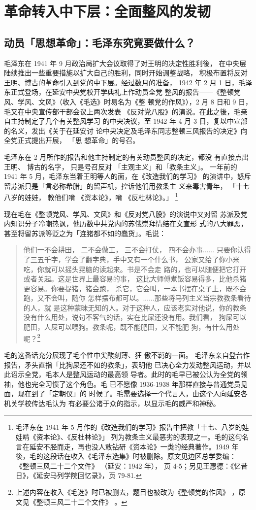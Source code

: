 \chapter{革命转入中下层：全面整风的发韧}
\section{动员「思想革命」：毛泽东究竟要做什么？}
毛泽东在 1941 年 9 月政治局扩大会议取得了对王明的决定性胜利後，
在中央层陆续推出一些重要措施以扩大自己的胜利，同时开始调整战略，
积极布置将反对王明、博古的革命引入到党的中下层。经过数月的准备，
1942 年 2 月 1 日，毛泽东正式登场，在延安中央党校开学典礼上作动员全党
整风的报告——《整顿党风、学风、文风》（收入《毛选》时易名为《整
顿党的作风》），2 月 8 日和 9 日，毛又在中央宣传部干部会议上两次发表
《反对党八股》的演说。在此之後，毛亲自主持制定了几个有关整风学习
的中央决议，至 1942 年 4 月 3 日，复以中宣部的名义，发出《关于在延安讨
论中央决定及毛泽东同志整顿三风报告的决定》向全党正式提出开展，
「思
想革命」的号召。

毛泽东在 2 月所作的报告和他主持制定的有关动员整风的决定，都没
有直接点出王明、
博古的名字，
只是号召反对
「主观主义」和「教条主义」。
一年前的 1941 年 5 月，毛泽东当着王明等人的面，在《改造我们的学习》
的演讲中，怒斥留苏派只是「言必称希腊」的留声机，控诉他们用教条主
义来毒害青年，
「十七八岁的娃娃，
教他们啃
《资本论》，啃
 《反杜林论》。」
\footnote{毛泽东在 1941 年 5 月作的《改造我们的学习》报告中把教「十七、八岁的娃娃啃《资本论》、《反杜林论》」
列为教条主义最恶劣的表现之一。毛的这句名言在延安不胫而走，再也没人敢钻研《资本论》一类的经典著作。1949 年
後，毛的这段话在收入《毛泽东选集》时被删除。原文见边区总学委编：
《整顿三风二十二个文件》
（延安：1942 年），
页 4-5；另见王惠德：《忆昔日》，《延安马列学院回忆录》，页 79-81.}

现在毛在《整顿党风、学风、文风》和《反对党八股》的演说中又对留
苏派及党内知识分子冷嘲热讽，他历数中共党内的苏俄崇拜情结在文宣形
式的八大罪恶，甚至将留苏派等贬之为「连猪都不如的蠢货」。毛说：
\begin{quote}
{\fzwkai 他们一不会耕田，
二不会做工，
三不会打仗，
四不会办事......
只要你认得了三五千字，学会了翻字典，手中又有一个什么书，
公家又给了你小米吃，你就可以摇头晃脑的读起来。书是不会走
路的，也可以随便把它打开或者关起。这是世界上最容易的事，
这比大师傅煮饭容易得多，比他杀猪更容易。你要捉猪，猪会跑，
杀它，它会叫，一本书摆在桌子上，既不会跑，又不会叫，随你
怎样摆布都可以。......那些将马列主义当宗教教条看待的人，就
是这种蒙昧无知的人。对于这种人，应该老实对他说，你的教条
没有什么用处，说句不客气的话，实在比屎还没有用。我们看，
狗屎可以肥田，人屎可以喂狗。教条呢，既不能肥田，又不能肥
狗，有什么用处呢？\footnote{上述内容在收入《毛选》时已被删去，题目也被改为《整顿党的作风》
，原文见《整顿三风二十二个文件》
。}}
\end{quote}
毛的这番话充分展现了毛个性中尖酸刻薄、狂
傲不羁的一面。
毛泽东亲自登台作报告，矛头直指「比狗屎还不如的教条」，表明他
已决心全力发动整风运动，并以此诏示全党，毛本人是整风运动的最高领
导者。此时的毛早已被公认为全党的领袖，他也完全习惯了这个角色。毛
已不愿像 1936-1938 年那样直接与普通党员见面，现在到了「定朝仪」的
时候了。毛需要选择一个代言人，由这个人向延安各机关学校传达毛认为
有必要公诸于众的指示，以显示毛的威严和神秘。

